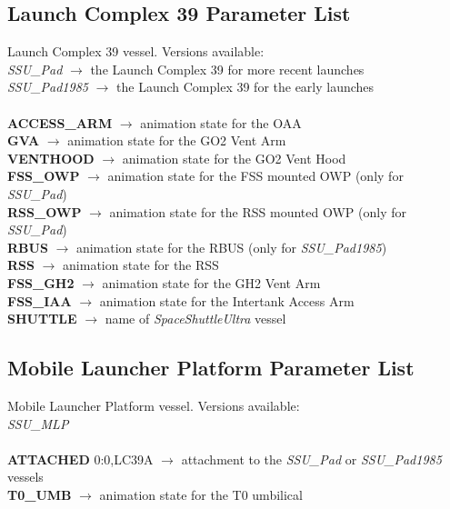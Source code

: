 \documentclass[Space_Shuttle_Ultra_Manual.tex]{subfiles}
\begin{document}
\begin{multicols*}{2}
\subsection{Launch Complex 39 Parameter List}
\noindent
Launch Complex 39 vessel. Versions available:
\\
\textit{SSU\_Pad} $\rightarrow$ the Launch Complex 39 for more recent launches
\\
\textit{SSU\_Pad1985} $\rightarrow$ the Launch Complex 39 for the early launches
\\
\\
\textbf{ACCESS\_ARM} $\rightarrow$ animation state for the OAA
\\
\textbf{GVA} $\rightarrow$ animation state for the GO2 Vent Arm
\\
\textbf{VENTHOOD} $\rightarrow$ animation state for the GO2 Vent Hood
\\
\textbf{FSS\_OWP} $\rightarrow$ animation state for the FSS mounted OWP (only for \textit{SSU\_Pad})
\\
\textbf{RSS\_OWP} $\rightarrow$ animation state for the RSS mounted OWP (only for \textit{SSU\_Pad})
\\
\textbf{RBUS} $\rightarrow$ animation state for the RBUS (only for \textit{SSU\_Pad1985})
\\
\textbf{RSS} $\rightarrow$ animation state for the RSS
\\
\textbf{FSS\_GH2} $\rightarrow$ animation state for the GH2 Vent Arm
\\
\textbf{FSS\_IAA} $\rightarrow$ animation state for the Intertank Access Arm
\\
\textbf{SHUTTLE} $\rightarrow$ name of \textit{SpaceShuttleUltra} vessel
\\

\subsection{Mobile Launcher Platform Parameter List}
\noindent
Mobile Launcher Platform vessel. Versions available:
\\
\textit{SSU\_MLP}
\\
\\
\textbf{ATTACHED} 0:0,LC39A $\rightarrow$ attachment to the \textit{SSU\_Pad} or \textit{SSU\_Pad1985} vessels
\\
\textbf{T0\_UMB} $\rightarrow$ animation state for the T0 umbilical
\\


\end{multicols*}
\end{document}
